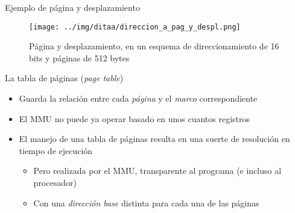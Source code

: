 \documentclass[presentation]{beamer}
\newcommand{\rarrow}{$\rightarrow$\hskip 0.5em}
\begin{document}
\begin{frame}[label={sec:org5df8068}]{Ejemplo de página y desplazamiento}
\begin{figure}[htbp]
\centering
\texttt{[image: ../img/ditaa/direccion\_a\_pag\_y\_despl.png]}
\caption{Página y desplazamiento, en un esquema de direccionamiento de 16 bits y páginas de 512 bytes}
\end{figure}
\end{frame}

\begin{frame}[label={sec:org7c582bf}]{La tabla de páginas (\emph{page table})}
\begin{itemize}
\item Guarda la relación entre cada \emph{página} y el \emph{marco} correspondiente
\item El MMU no puede ya operar basado en unos cuantos registros
\item El manejo de una tabla de páginas resulta en una suerte de
resolución en tiempo de ejecución
\begin{itemize}
\item Pero realizada por el MMU, transparente al programa (e incluso al
procesador)
\item Con una \emph{dirección base} distinta para cada una de las páginas
\end{itemize}
\end{itemize}
\end{frame}
\end{document}
